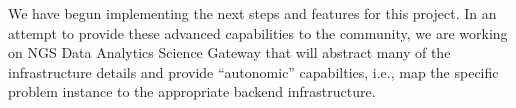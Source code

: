 \documentclass{acm_proc_article-sp}
\begin{document}
We have begun implementing the next steps and features for this
project. In an attempt to provide these advanced capabilities to the
community, we are working on NGS Data Analytics Science Gateway that
will abstract many of the infrastructure details and provide
``autonomic'' capabilties, i.e., map the specific problem instance to
the appropriate backend infrastructure.




\end{document}
